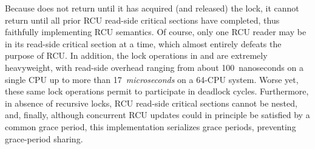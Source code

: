 Because  does not return until it has acquired
(and released) the lock, it cannot return until all prior RCU read-side
critical sections have completed, thus faithfully implementing
RCU semantics.
Of course, only one RCU reader may be in its read-side critical section
at a time, which almost entirely defeats the purpose of RCU\@.
In addition, the lock operations in  and
 are extremely heavyweight,
with read-side overhead ranging from about 100~nanoseconds on a single 
CPU up to more than 17~\emph{microseconds} on a 64-CPU system.
Worse yet,
these same lock operations permit 
to participate in deadlock cycles.
Furthermore, in absence of recursive locks,
RCU read-side critical sections cannot be nested, and, finally,
although concurrent RCU updates could in principle be satisfied by
a common grace period, this implementation serializes grace periods,
preventing grace-period sharing.

\fi

